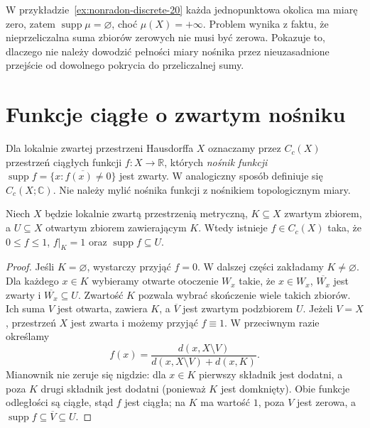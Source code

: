 \begin{uwaga}
W przykładzie~\ref{ex:nonradon-discrete-20} każda
jednopunktowa okolica ma miarę zero, zatem
$\operatorname{supp}\mu=\varnothing$, choć
$\mu(X)=+\infty$. Problem wynika z faktu, że
nieprzeliczalna suma zbiorów zerowych nie musi być
zerowa. Pokazuje to, dlaczego nie należy dowodzić
pełności miary nośnika przez nieuzasadnione przejście
od dowolnego pokrycia do przeliczalnej sumy.
\end{uwaga}

\section{Funkcje ciągłe o zwartym nośniku}
Dla lokalnie zwartej przestrzeni Hausdorffa $X$ oznaczamy
przez $C_c(X)$ przestrzeń ciągłych funkcji
$f:X\to\mathbb R$, których \emph{nośnik funkcji}
$\operatorname{supp}f=\overline{\{x:f(x)\neq0\}}$
jest zwarty. W analogiczny sposób definiuje się
$C_c(X;\mathbb C)$. Nie należy mylić nośnika funkcji
z nośnikiem topologicznym miary.

\begin{lemat}
\label{lem:cutoff-radon-20}
Niech $X$ będzie lokalnie zwartą przestrzenią metryczną,
$K\subseteq X$ zwartym zbiorem, a $U\subseteq X$
otwartym zbiorem zawierającym $K$. Wtedy istnieje
$f\in C_c(X)$ taka, że $0\le f\le1$, $f|_K=1$
oraz $\operatorname{supp}f\subseteq U$.
\end{lemat}
\begin{proof}
Jeśli $K=\varnothing$, wystarczy przyjąć $f=0$.
W dalszej części zakładamy $K\neq\varnothing$.
Dla każdego $x\in K$ wybieramy otwarte otoczenie
$W_x$ takie, że $x\in W_x$, $\overline{W_x}$ jest
zwarty i $\overline{W_x}\subseteq U$.
Zwartość $K$ pozwala wybrać skończenie wiele takich
zbiorów. Ich suma $V$ jest otwarta, zawiera $K$,
a $\overline V$ jest zwartym podzbiorem $U$.
Jeżeli $V=X$, przestrzeń $X$ jest zwarta
i możemy przyjąć $f\equiv1$. W przeciwnym razie
określamy
\[
 f(x)=\frac{d(x,X\setminus V)}
 {d(x,X\setminus V)+d(x,K)}.
\]
Mianownik nie zeruje się nigdzie: dla $x\in K$
pierwszy składnik jest dodatni, a poza $K$ drugi
składnik jest dodatni (ponieważ $K$ jest domknięty).
Obie funkcje odległości są ciągłe, stąd $f$ jest
ciągła; na $K$ ma wartość $1$, poza $V$ jest zerowa,
a $\operatorname{supp}f\subseteq\overline V\subseteq U$.
\end{proof}

